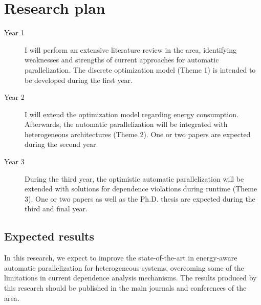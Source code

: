\documentclass[a4paper,12pt]{article}
\newcommand\FIXME[1]{\textcolor{red}{FIX:}\textcolor{red}{#1}}
\begin{document}
\section{Research plan}

\begin{description}

\item[Year 1] I will perform an extensive literature review in the area,
identifying weaknesses and strengths of current approaches for automatic
parallelization.  The discrete optimization model (Theme 1) is intended to be
developed during the first year.

\item[Year 2] I will extend the optimization model regarding energy
consumption.  Afterwards, the automatic parallelization will be integrated with
heterogeneous architectures (Theme 2).  One or two papers are expected during
the second year.   

\item[Year 3] During the third year, the optimistic automatic parallelization
will be extended with solutions for dependence violations during runtime (Theme
3).  One or two papers as well as the Ph.D. thesis are expected during the
third and final year.

\end{description}

\subsection{Expected results}

In this research, we expect to improve the state-of-the-art in energy-aware
automatic parallelization for heterogeneous systems, overcoming some of the
limitations in current dependence analysis mechanisms.  The results produced by
this research should be published in the main journals and conferences of the
area.




\end{document}
